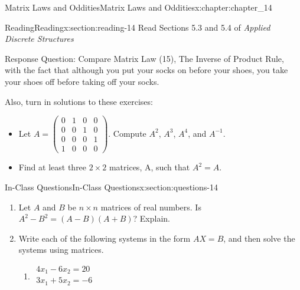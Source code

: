 \documentclass[oneside,10pt,]{book}
\numberwithin{equation}{section}
\begin{document}
\begin{chapterptx}{Matrix Laws and Oddities}{}{Matrix Laws and Oddities}{}{}{x:chapter:chapter_14}
\index{}%
%
%
\typeout{************************************************}
\typeout{************************************************}
%
\begin{sectionptx}{Reading}{}{Reading}{}{}{x:section:reading-14}
Read Sections 5.3 and 5.4 of \emph{Applied Discrete Structures}%
\par
Response Question: Compare Matrix Law (15), The Inverse of Product Rule, with the fact that although you put your socks on before your shoes, you take your shoes off before taking off your socks.%
\par
Also, turn in solutions to these exercises:%
\begin{itemize}[label=\textbullet]
\item{}Let \(A=\left(\begin{array}{cccc} 0 &1&0&0\\ 0 &0&1&0\\ 0&0&0&1\\ 1 &0&0&0 \end{array}\right)\). Compute \(A^2\), \(A^3\), \(A^4\), and \(A^{-1}\).%
\item{}Find at least three \(2\times2\) matrices, A, such that \(A^2=A\).%
\end{itemize}
%
\end{sectionptx}
%
%
\typeout{************************************************}
\typeout{************************************************}
%
\begin{sectionptx}{In-Class Questions}{}{In-Class Questions}{}{}{x:section:questions-14}
%
\begin{enumerate}[label=\arabic*.]
\item{}Let \(A\) and \(B\) be \(n\times n\) matrices of real numbers. Is \(A^2-B^2= (A-B)(A+B)\)?  Explain.%
\item{}Write each of the following systems in the form \(A X = B\), and then solve the systems using matrices.%
\par
%
\begin{multicols}{2}
\begin{enumerate}[label=(\alph*)]
\item{}\(\begin{array}{c}4x_1-6x_2=20\\
3x_1+5x_2= -6\\
\end{array}\)%

\end{enumerate}
\end{multicols}
\end{enumerate}
\end{sectionptx}
\end{chapterptx}
\end{document}
